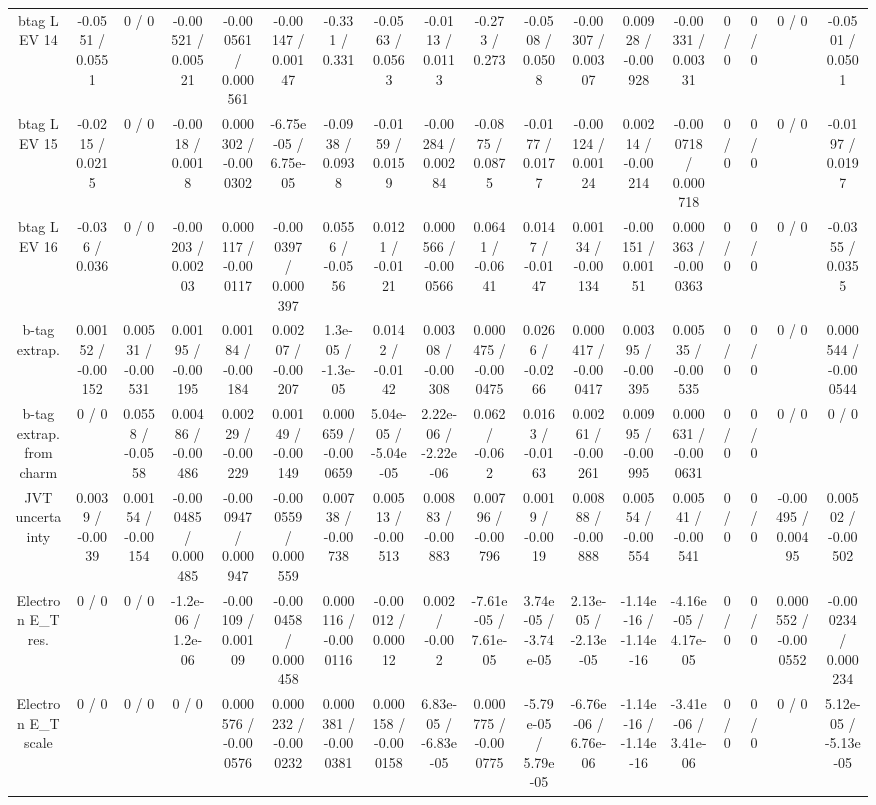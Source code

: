 \documentclass[10pt]{article}
\begin{document}
\begin{table}[htbp]
\begin{center}
\begin{tabular}{|c|c|c|c|c|c|c|c|c|c|c|c|c|c|c|c|c|c|}
  btag L EV 14 & -0.0551 / 0.0551 & 0 / 0 & -0.00521 / 0.00521 & -0.000561 / 0.000561 & -0.00147 / 0.00147 & -0.331 / 0.331 & -0.0563 / 0.0563 & -0.0113 / 0.0113 & -0.273 / 0.273 & -0.0508 / 0.0508 & -0.00307 / 0.00307 & 0.00928 / -0.00928 & -0.00331 / 0.00331 & 0 / 0 & 0 / 0 & 0 / 0 & -0.0501 / 0.0501 \\ 
  btag L EV 15 & -0.0215 / 0.0215 & 0 / 0 & -0.0018 / 0.0018 & 0.000302 / -0.000302 & -6.75e-05 / 6.75e-05 & -0.0938 / 0.0938 & -0.0159 / 0.0159 & -0.00284 / 0.00284 & -0.0875 / 0.0875 & -0.0177 / 0.0177 & -0.00124 / 0.00124 & 0.00214 / -0.00214 & -0.000718 / 0.000718 & 0 / 0 & 0 / 0 & 0 / 0 & -0.0197 / 0.0197 \\ 
  btag L EV 16 & -0.036 / 0.036 & 0 / 0 & -0.00203 / 0.00203 & 0.000117 / -0.000117 & -0.000397 / 0.000397 & 0.0556 / -0.0556 & 0.0121 / -0.0121 & 0.000566 / -0.000566 & 0.0641 / -0.0641 & 0.0147 / -0.0147 & 0.00134 / -0.00134 & -0.00151 / 0.00151 & 0.000363 / -0.000363 & 0 / 0 & 0 / 0 & 0 / 0 & -0.0355 / 0.0355 \\ 
  b-tag extrap. & 0.00152 / -0.00152 & 0.00531 / -0.00531 & 0.00195 / -0.00195 & 0.00184 / -0.00184 & 0.00207 / -0.00207 & 1.3e-05 / -1.3e-05 & 0.0142 / -0.0142 & 0.00308 / -0.00308 & 0.000475 / -0.000475 & 0.0266 / -0.0266 & 0.000417 / -0.000417 & 0.00395 / -0.00395 & 0.00535 / -0.00535 & 0 / 0 & 0 / 0 & 0 / 0 & 0.000544 / -0.000544 \\ 
  b-tag extrap. from charm & 0 / 0 & 0.0558 / -0.0558 & 0.00486 / -0.00486 & 0.00229 / -0.00229 & 0.00149 / -0.00149 & 0.000659 / -0.000659 & 5.04e-05 / -5.04e-05 & 2.22e-06 / -2.22e-06 & 0.062 / -0.062 & 0.0163 / -0.0163 & 0.00261 / -0.00261 & 0.00995 / -0.00995 & 0.000631 / -0.000631 & 0 / 0 & 0 / 0 & 0 / 0 & 0 / 0 \\ 
  JVT uncertainty & 0.0039 / -0.0039 & 0.00154 / -0.00154 & -0.000485 / 0.000485 & -0.000947 / 0.000947 & -0.000559 / 0.000559 & 0.00738 / -0.00738 & 0.00513 / -0.00513 & 0.00883 / -0.00883 & 0.00796 / -0.00796 & 0.0019 / -0.0019 & 0.00888 / -0.00888 & 0.00554 / -0.00554 & 0.00541 / -0.00541 & 0 / 0 & 0 / 0 & -0.00495 / 0.00495 & 0.00502 / -0.00502 \\ 
  Electron E_{T} res. & 0 / 0 & 0 / 0 & -1.2e-06 / 1.2e-06 & -0.00109 / 0.00109 & -0.000458 / 0.000458 & 0.000116 / -0.000116 & -0.00012 / 0.00012 & 0.002 / -0.002 & -7.61e-05 / 7.61e-05 & 3.74e-05 / -3.74e-05 & 2.13e-05 / -2.13e-05 & -1.14e-16 / -1.14e-16 & -4.16e-05 / 4.17e-05 & 0 / 0 & 0 / 0 & 0.000552 / -0.000552 & -0.000234 / 0.000234 \\ 
  Electron E_{T} scale & 0 / 0 & 0 / 0 & 0 / 0 & 0.000576 / -0.000576 & 0.000232 / -0.000232 & 0.000381 / -0.000381 & 0.000158 / -0.000158 & 6.83e-05 / -6.83e-05 & 0.000775 / -0.000775 & -5.79e-05 / 5.79e-05 & -6.76e-06 / 6.76e-06 & -1.14e-16 / -1.14e-16 & -3.41e-06 / 3.41e-06 & 0 / 0 & 0 / 0 & 0 / 0 & 5.12e-05 / -5.13e-05 \\ 

\end{tabular}
\end{center}
\end{table}
\end{document}
